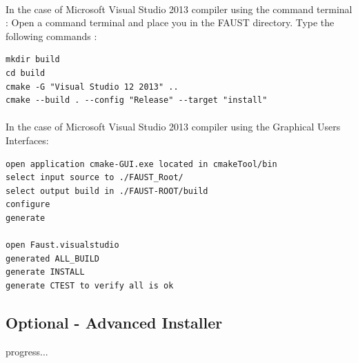 \paragraph{}In the case of Microsoft Visual Studio 2013 compiler using the command terminal :
Open a command terminal and place you in the FAUST directory. Type the following commands : 
\begin{lstlisting}
mkdir build
cd build
cmake -G "Visual Studio 12 2013" .. 
cmake --build . --config "Release" --target "install"
\end{lstlisting}


\paragraph{}In the case of Microsoft Visual Studio 2013 compiler using the Graphical Users Interfaces:
\begin{lstlisting}
open application cmake-GUI.exe located in cmakeTool/bin
select input source to ./FAUST_Root/
select output build in ./FAUST-ROOT/build
configure
generate

open Faust.visualstudio
generated ALL_BUILD
generate INSTALL
generate CTEST to verify all is ok
\end{lstlisting}



\subsection{Optional - Advanced Installer}\label{sec:WinOptionalInstall}

progress... 



